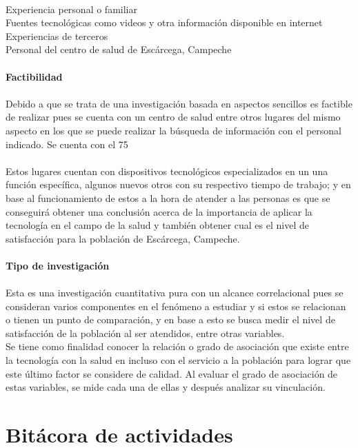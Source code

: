 \documentclass [a4paper, 12pt]{report}
\begin{document}
 \\
Experiencia personal o familiar \\
Fuentes tecnológicas como videos y otra información disponible en internet \\
Experiencias de terceros \\
Personal del centro de salud de Escárcega, Campeche \\
 \\
\textbf{Factibilidad} \\
 \\
Debido a que se trata de una investigación basada en aspectos sencillos es factible de realizar pues se cuenta con un centro de salud entre otros lugares del mismo aspecto en los que se puede realizar la búsqueda de información con el personal indicado. 
Se cuenta con el 75%
 \\
 \\
Estos lugares cuentan con dispositivos tecnológicos especializados en un una función específica, algunos nuevos otros con su respectivo tiempo de trabajo; y en base al funcionamiento de estos a la hora de atender a las personas es que se conseguirá obtener una conclusión acerca de la importancia de aplicar la tecnología en el campo de la salud y también obtener cual es el nivel de satisfacción para la población de Escárcega, Campeche. \\
 \\
\textbf{Tipo de investigación} \\
 \\
Esta es una investigación cuantitativa pura con un alcance correlacional pues se consideran varios componentes en el fenómeno a estudiar y si estos se relacionan o tienen un punto de comparación, y en base a esto se busca medir el nivel de satisfacción de la población al ser atendidos, entre otras variables. \\
Se tiene como finalidad conocer la relación o grado de asociación que existe entre la tecnología con la salud en incluso con el servicio a la población para lograr que este último factor se considere de calidad. Al evaluar el grado de asociación de estas variables, se mide cada una de ellas y después analizar su vinculación.
\section{Bitácora de actividades}
\end{document}
